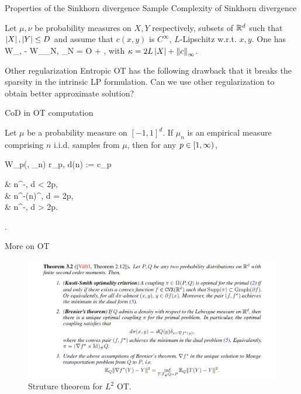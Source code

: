 \documentclass{beamer}
\begin{document}
\begin{frame}{Properties of the Sinkhorn divergence}
	Sample Complexity of Sinkhorn divergence
	\begin{Thm}[A. Genevay et. al, 2019]
		Let $\mu, \nu$ be probability measures on $X, Y$ respectively, subsets of $\mathbb{R}^d$ such that $\left| X \right|, \left| Y \right| \leq D$ and
assume that $c(x, y)$ is $C^{\infty}$, $L$-Lipschitz w.r.t. $x, y$. One has
		\bequ
			\mbE\lv W_{\epsilon}\lp \mu, \nu \rp - W_{\epsilon}\lp \wht \mu_N, \wht \nu_N \rp \rv = O\lp {} + \rp \rp,
		\eequ
		with $\kappa = 2L\left| X \right| + \left\| c \right\|_{\infty}$.
	\end{Thm}
\end{frame}


\begin{frame}{Other regularization}
	Entropic OT has the following drawback that it breaks the sparsity in the intrinsic LP formulation. Can we use other regularization to obtain better approximate solution?
\end{frame}


\begin{frame}{CoD in OT computation}
	\begin{Thm}[Boissard et. al, 2014.]
		Let $\mu$ be a probability measure on $[-1, 1]^d$. If $\mu_n$ is an empirical measure comprising $n$ i.i.d. samples from $\mu$, then for any $p \in \left[ 1, \infty \right)$,
		\bequ
			\begin{aligned}
				\mbE W_{p}(\mu, \mu_n) \leq r_{p, d}(n) := c_p\lbb\begin{aligned}
					& n^{-}, \quad d < 2p,	\\
					& n^{-}(\log n)^{}, \quad d = 2p,		\\
					& n^{-}, \quad d > 2p.
				\end{aligned}\right.
			\end{aligned}
		\eequ
	\end{Thm}
\end{frame}


\begin{frame}{More on OT}
	\begin{figure}[H]
          \centering
          \centerline{\includegraphics[width=1.2\linewidth]{Brenier.png}}
          \caption{Struture theorem for $L^2$ OT.}
        \end{figure}
\end{frame}
\end{document}
